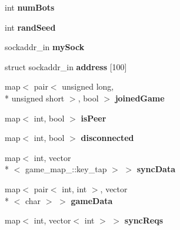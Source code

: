 \begin{DoxyCompactItemize}
\item 
\hypertarget{class_network_ac719908e9eb662f632205a83abb7be2e}{int {\bfseries num\+Bots}}\label{class_network_ac719908e9eb662f632205a83abb7be2e}

\item 
\hypertarget{class_network_a0994f93531b37c3c11e682bd654c3c4b}{int {\bfseries rand\+Seed}}\label{class_network_a0994f93531b37c3c11e682bd654c3c4b}

\item 
\hypertarget{class_network_a45d45e582034940f2ae452506a710d52}{sockaddr\+\_\+in {\bfseries my\+Sock}}\label{class_network_a45d45e582034940f2ae452506a710d52}

\item 
\hypertarget{class_network_a20a98965095da80d47c97c187e7e385d}{struct sockaddr\+\_\+in {\bfseries address} \mbox{[}100\mbox{]}}\label{class_network_a20a98965095da80d47c97c187e7e385d}

\item 
\hypertarget{class_network_ac1ee47631d9883fe9a7419cd89897304}{map$<$ pair$<$ unsigned long, \\*
unsigned short $>$, bool $>$ {\bfseries joined\+Game}}\label{class_network_ac1ee47631d9883fe9a7419cd89897304}

\item 
\hypertarget{class_network_a3d1983ee1fcd943e0a8a32bd9ba0b83f}{map$<$ int, bool $>$ {\bfseries is\+Peer}}\label{class_network_a3d1983ee1fcd943e0a8a32bd9ba0b83f}

\item 
\hypertarget{class_network_a73ddf767aa95b10d109bc0170497a19e}{map$<$ int, bool $>$ {\bfseries disconnected}}\label{class_network_a73ddf767aa95b10d109bc0170497a19e}

\item 
\hypertarget{class_network_aea75e6ad1936872e9314c4330162d753}{map$<$ int, vector\\*
$<$ game\+\_\+map\+\_\+\+::key\+\_\+tap $>$ $>$ {\bfseries sync\+Data}}\label{class_network_aea75e6ad1936872e9314c4330162d753}

\item 
\hypertarget{class_network_aee9e63ab9fa83b453885a98eec502b62}{map$<$ pair$<$ int, int $>$, vector\\*
$<$ char $>$ $>$ {\bfseries game\+Data}}\label{class_network_aee9e63ab9fa83b453885a98eec502b62}

\item 
\hypertarget{class_network_a97f4e6af739b6cd278673766bc2986e5}{map$<$ int, vector$<$ int $>$ $>$ {\bfseries sync\+Reqs}}\label{class_network_a97f4e6af739b6cd278673766bc2986e5}


\end{DoxyCompactItemize}
